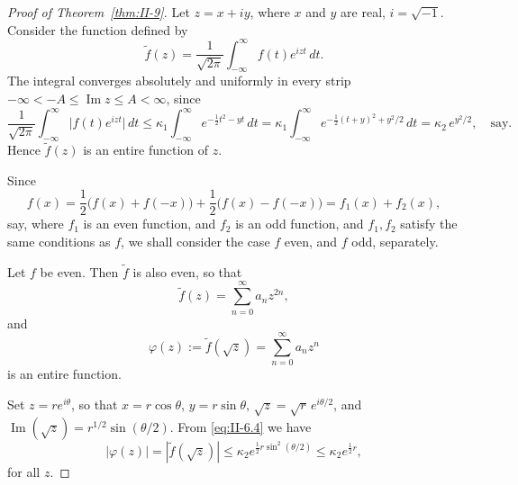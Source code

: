 \begin{proof}[Proof of Theorem~\ref{thm:II-9}]
Let $z=x+iy$, where $x$ and $y$ are real, $i=\sqrt{-1}$. Consider the function defined by
\begin{equation}\tag{6.3}\label{eq:II-6.3}
\tilde f(z)=\frac{1}{\sqrt{2\pi}}\int_{-\infty}^{\infty}f(t)e^{izt}\,dt.
\end{equation}
The integral converges absolutely and uniformly in every strip $-\infty<-A\le\operatorname{Im}z\le A<\infty$, since
\[
\frac{1}{\sqrt{2\pi}}\int_{-\infty}^{\infty}\bigl|f(t)e^{izt}\bigr|\,dt
\le\kappa_{1}\int_{-\infty}^{\infty}e^{-\frac{1}{2}t^{2}-yt}\,dt
=\kappa_{1}\int_{-\infty}^{\infty}e^{-\frac{1}{2}(t+y)^{2}+y^{2}/2}\,dt
=\kappa_{2}\,e^{y^{2}/2},\quad\text{say}.
\]
Hence $\tilde f(z)$ is an entire function of $z$.

Since
\[
f(x)=\frac{1}{2}\bigl(f(x)+f(-x)\bigr)+\frac{1}{2}\bigl(f(x)-f(-x)\bigr)
=f_{1}(x)+f_{2}(x),
\]
say, where $f_{1}$ is an even function, and $f_{2}$ is an odd function, and $f_{1},f_{2}$ satisfy the same conditions as $f$, we shall consider the case $f$ even, and $f$ odd, separately.

Let $f$ be even. Then $\tilde f$ is also even, so that
\[
\tilde f(z)=\sum_{n=0}^{\infty}a_{n}z^{2n},
\]
and
\begin{equation}\tag{6.4}\label{eq:II-6.4}
\varphi(z):=\tilde f(\sqrt{z})=\sum_{n=0}^{\infty}a_{n}z^{n}
\end{equation}
is an entire function.

Set $z=r e^{i\theta}$, so that $x=r\cos\theta$, $y=r\sin\theta$, $\sqrt{z}=\sqrt{r}\,e^{i\theta/2}$, and $\operatorname{Im}(\sqrt{z})=r^{1/2}\sin(\theta/2)$. From \eqref{eq:II-6.4} we have
\begin{equation}\tag{6.5}\label{eq:II-6.5}
|\varphi(z)|=|\tilde f(\sqrt{z})|\le\kappa_{2}e^{\frac{1}{2}r\sin^{2}(\theta/2)}
\le\kappa_{2}e^{\frac{1}{2}r},
\end{equation}
for all $z$.


\end{proof}
